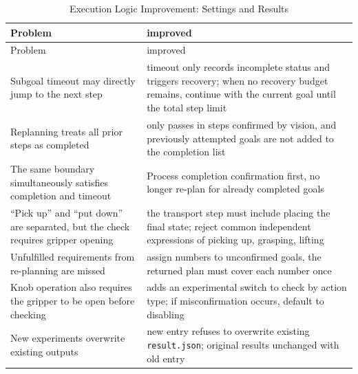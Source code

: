 \FloatBarrier\begingroup\small\setlength{\tabcolsep}{2.5pt}
\begin{longtable}[]{@{}
  >{\raggedright\arraybackslash}p{}
  >{\raggedright\arraybackslash}p{}@{}}
\caption{Execution Logic Improvement: Settings and Results}\label{tab:s10-2}\tabularnewline
\toprule\noalign{}
\begin{minipage}[b]{\linewidth}\raggedright
Problem
\end{minipage} & \begin{minipage}[b]{\linewidth}\raggedright
improved
\end{minipage} \\
\midrule\noalign{}
\endfirsthead
\toprule\noalign{}
\begin{minipage}[b]{\linewidth}\raggedright
Problem
\end{minipage} & \begin{minipage}[b]{\linewidth}\raggedright
improved
\end{minipage} \\
\midrule\noalign{}
\endhead
\bottomrule\noalign{}
\endlastfoot
Subgoal timeout may directly jump to the next step & timeout only records incomplete status and triggers recovery; when no recovery budget remains, continue with the current goal until the total step limit \\
Replanning treats all prior steps as completed & only passes in steps confirmed by vision, and previously attempted goals are not added to the completion list \\
The same boundary simultaneously satisfies completion and timeout & Process completion confirmation first, no longer re-plan for already completed goals \\
``Pick up'' and ``put down'' are separated, but the check requires gripper opening & the transport step must include placing the final state; reject common independent expressions of picking up, grasping, lifting \\
Unfulfilled requirements from re-planning are missed & assign numbers to unconfirmed goals, the returned plan must cover each number once \\
Knob operation also requires the gripper to be open before checking & adds an experimental switch to check by action type; if misconfirmation occurs, default to disabling \\
New experiments overwrite existing outputs & new entry refuses to overwrite existing \texttt{result.json}; original results unchanged with old entry \\
\end{longtable}\endgroup

